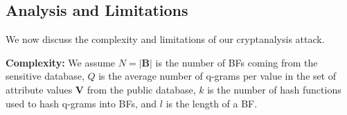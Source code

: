 \documentclass{llncs}
\begin{document}

%

%


\subsection{Analysis and Limitations}

\label{sec-analysis}
We now discuss the complexity and limitations of our cryptanalysis
attack.
\smallskip

\textbf{Complexity:}
We assume $N = |\mathbf{B}|$ is the number of BFs coming from the
sensitive database, $Q$ is the average number of q-grams per value
in the set of attribute values $\textbf{V}$ from the public
database, $k$ is the number of hash functions used to hash q-grams
into BFs, and $l$ is the length of a BF.
\end{document}
